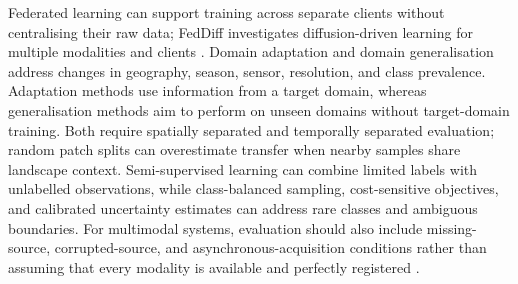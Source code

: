 \documentclass[]{interact}
\theoremstyle{plain}%
\theoremstyle{definition}
\theoremstyle{remark}
\DeclareRobustCommand{\DIFadd}[1]{{\protect\color{DIFaddcolor}\uwave{#1}}}
\DeclareRobustCommand{\DIFdel}[1]{{\protect\color{DIFdelcolor}\sout{#1}}}
\def\DIFadd#1{#1}%
\def\DIFdel#1{}%
\begin{document}
\DIFadd{Federated} \DIFadd{learning} \DIFadd{can} \DIFadd{support} \DIFadd{training} \DIFadd{across} \DIFadd{separate} \DIFadd{clients} \DIFadd{without} \DIFadd{centralising} \DIFadd{their} \DIFadd{raw} \DIFadd{data}\DIFadd{;} \DIFadd{FedDiff} \DIFadd{investigates} \DIFadd{diffusion-driven} \DIFadd{learning} \DIFadd{for} \DIFadd{multiple} \DIFadd{modalities} \DIFadd{and} \DIFadd{clients} {\color{blue}\citep{li2024feddiff}}\DIFadd{.} \DIFadd{Domain} \DIFadd{adaptation} \DIFadd{and} \DIFadd{domain} \DIFadd{generalisation} \DIFadd{address} \DIFadd{changes} in \DIFdel{high-precision} \DIFadd{geography}\DIFadd{,} \DIFadd{season}\DIFadd{,} \DIFadd{sensor}\DIFadd{,} \DIFadd{resolution}\DIFadd{,} \DIFadd{and} \DIFadd{class} \DIFadd{prevalence}\DIFadd{.} \DIFadd{Adaptation} \DIFadd{methods} \DIFadd{use} \DIFadd{information} \DIFadd{from} \DIFadd{a} \DIFadd{target} \DIFadd{domain}\DIFadd{,} \DIFadd{whereas} \DIFadd{generalisation} \DIFadd{methods} \DIFadd{aim} \DIFadd{to} \DIFadd{perform} \DIFadd{on} \DIFadd{unseen} \DIFadd{domains} \DIFadd{without} \DIFadd{target-domain} \DIFadd{training}\DIFadd{.} \DIFadd{Both} \DIFadd{require} \DIFadd{spatially} \DIFadd{separated} \DIFadd{and} \DIFadd{temporally} \DIFadd{separated} \DIFadd{evaluation}\DIFadd{;} \DIFadd{random} \DIFadd{patch} \DIFadd{splits} \DIFadd{can} \DIFadd{overestimate} \DIFadd{transfer} \DIFadd{when} \DIFadd{nearby} \DIFadd{samples} \DIFadd{share} \DIFadd{landscape} \DIFadd{context}\DIFadd{.} \DIFadd{Semi-supervised} \DIFadd{learning} \DIFadd{can} \DIFadd{combine} \DIFadd{limited} \DIFadd{labels} \DIFadd{with} \DIFadd{unlabelled} \DIFadd{observations}\DIFadd{,} \DIFadd{while} \DIFadd{class-balanced} \DIFadd{sampling}\DIFadd{,} \DIFadd{cost-sensitive} \DIFadd{objectives}\DIFadd{,} \DIFadd{and} \DIFadd{calibrated} \DIFadd{uncertainty} \DIFadd{estimates} \DIFadd{can} \DIFadd{address} \DIFadd{rare} \DIFadd{classes} \DIFadd{and} \DIFadd{ambiguous} \DIFadd{boundaries}\DIFadd{.} \DIFadd{For} \DIFadd{multimodal} \DIFadd{systems}\DIFadd{,} \DIFadd{evaluation} \DIFadd{should} \DIFadd{also} \DIFadd{include} \DIFadd{missing-source}\DIFadd{,} \DIFadd{corrupted-source}\DIFadd{,} \DIFadd{and} \DIFadd{asynchronous-acquisition} \DIFadd{conditions} \DIFadd{rather} \DIFadd{than} \DIFadd{assuming} \DIFadd{that} \DIFadd{every} \DIFadd{modality} \DIFadd{is} \DIFadd{available} \DIFadd{and} \DIFadd{perfectly} \DIFadd{registered} {\color{blue}\citep{kampffmeyer2018urban}}\DIFadd{.}
\end{document}
